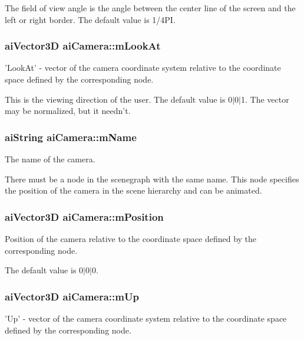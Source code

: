 The field of view angle is the angle between the center line of the screen and the left or right border. The default value is 1/4\-P\-I. \hypertarget{structai_camera_af9463249ac870e030fa435b1186cef23}{
\subsubsection[{m\-Look\-At}]{ {\bf ai\-Vector3\-D} ai\-Camera\-::m\-Look\-At}}\label{structai_camera_af9463249ac870e030fa435b1186cef23}
'Look\-At' -\/ vector of the camera coordinate system relative to the coordinate space defined by the corresponding node.

This is the viewing direction of the user. The default value is 0$\vert$0$\vert$1. The vector may be normalized, but it needn't. \hypertarget{structai_camera_aa6a5fe5e04b3db1b23f69eb9910c6816}{
\subsubsection[{m\-Name}]{ {\bf ai\-String} ai\-Camera\-::m\-Name}}\label{structai_camera_aa6a5fe5e04b3db1b23f69eb9910c6816}
The name of the camera.

There must be a node in the scenegraph with the same name. This node specifies the position of the camera in the scene hierarchy and can be animated. \hypertarget{structai_camera_a518617ea192ca0698e748a4399e7c3a5}{
\subsubsection[{m\-Position}]{ {\bf ai\-Vector3\-D} ai\-Camera\-::m\-Position}}\label{structai_camera_a518617ea192ca0698e748a4399e7c3a5}
Position of the camera relative to the coordinate space defined by the corresponding node.

The default value is 0$\vert$0$\vert$0. \hypertarget{structai_camera_a7fb42b287389b4f99c883098268d6d1a}{
\subsubsection[{m\-Up}]{ {\bf ai\-Vector3\-D} ai\-Camera\-::m\-Up}}\label{structai_camera_a7fb42b287389b4f99c883098268d6d1a}
'Up' -\/ vector of the camera coordinate system relative to the coordinate space defined by the corresponding node.

